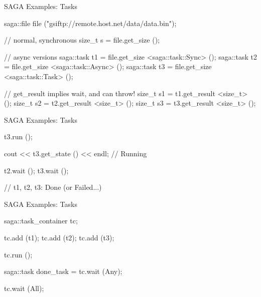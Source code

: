 \documentclass[%
  pdf,
  colorBG,
  slideColor,
  frames,
  ogf
]{prosper}
\begin{document}

 \begin{slide}{SAGA Examples: Tasks}

  \begin{mycode}[label=tasks (ii)]

  saga::file file ("gsiftp://remote.host.net/data/data.bin");

  // normal, synchronous
  size_t s = file.get_size ();

  // async versions
  saga::task t1 = file.get_size <saga::task::Sync>  ();
  saga::task t2 = file.get_size <saga::task::Async> ();
  saga::task t3 = file.get_size <saga::task::Task>  ();

  // get_result implies wait, and can throw!
  size_t s1 = t1.get_result <size_t> ();
  size_t s2 = t2.get_result <size_t> ();
  size_t s3 = t3.get_result <size_t> ();

  \end{mycode}
   
 \end{slide}


 \begin{slide}{SAGA Examples: Tasks}

  \begin{mycode}[label=tasks (iii)]
  
  t3.run ();

  cout << t3.get_state () << endl;  // Running

  t2.wait ();
  t3.wait ();

  // t1, t2, t3: Done (or Failed...)

  \end{mycode}
   
 \end{slide}


 \begin{slide}{SAGA Examples: Tasks}

  \begin{mycode}[label=tasks container]
  
  saga::task_container tc;

  tc.add (t1);
  tc.add (t2);
  tc.add (t3);

  tc.run  ();
  
  saga::task done_task = tc.wait (Any);

  tc.wait (All);

  \end{mycode}
   
 \end{slide}
\end{document}
